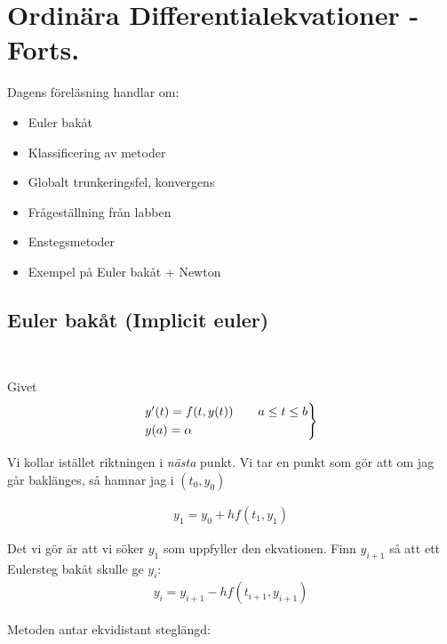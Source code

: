 \section{Ordinära Differentialekvationer - Forts.}
\par\bigskip
\noindent Dagens föreläsning handlar om:
\begin{itemize}
  \item Euler bakåt
  \item Klassificering av metoder
  \item Globalt trunkeringsfel, konvergens
  \item Frågeställning från labben
  \item Enstegsmetoder
  \item Exempel på Euler bakåt + Newton
\end{itemize}
\par\bigskip
\subsection{Euler bakåt (Implicit euler)}\hfill\\
\par\bigskip
\noindent Givet
\begin{equation*}
  \begin{gathered}
    \begin{rcases*}
      y^{\prime}(t) = f(t, y(t))\qquad a\leq t\leq b\\
      y(a) = \alpha
    \end{rcases*}
  \end{gathered}
\end{equation*}
\par\bigskip
\noindent Vi kollar istället riktningen i \textit{nästa} punkt. Vi tar en punkt som gör att om jag går baklänges, så hamnar jag i $(t_0, y_0)$
\par\bigskip

\begin{equation*}
  \begin{gathered}
    y_1 = y_0+hf(t_1,y_1)
  \end{gathered}
\end{equation*}
\par\bigskip
\noindent Det vi gör är att vi söker $y_1$ som uppfyller den ekvationen. Finn $y_{i+1}$ så att ett Eulersteg bakåt skulle ge $y_i$:
\begin{equation*}
  \begin{gathered}
    y_i = y_{i+1}-hf(t_{i+1}, y_{i+1})
  \end{gathered}
\end{equation*}
\par\bigskip
\noindent Metoden antar ekvidistant steglängd:
\par\bigskip

